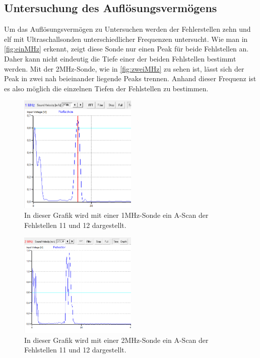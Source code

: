 \subsection{Untersuchung des Auflösungsvermögens}
\label{subsec:auflösung}
Um das Auflösungsvermögen zu Untersuchen werden der Fehlerstellen zehn und elf mit Ultraschallsonden unterschiedlicher Frequenzen untersucht.
Wie man in \autoref{fig:einMHz} erkennt, zeigt diese Sonde nur einen Peak für beide Fehlstellen an. Daher kann nicht eindeutig die Tiefe einer der beiden Fehlstellen bestimmt werden.
Mit der 2MHz-Sonde, wie in \autoref{fig:zweiMHz} zu sehen ist, lässt sich der Peak in zwei nah beieinander liegende Peaks trennen. Anhand dieser Frequenz ist es also möglich 
die einzelnen Tiefen der Fehlstellen zu bestimmen.
\begin{figure}
  \centering
\includegraphics[width=0.5\textwidth]{content/einMHz.pdf}
  \caption{In dieser Grafik wird mit einer 1MHz-Sonde ein A-Scan der Fehlstellen 11 und 12 dargestellt.}
  \label{fig:einMHz}
\end{figure}
\begin{figure}[H]
  \centering
\includegraphics[width=0.5\textwidth]{content/2MHz (unten).pdf}
  \caption{In dieser Grafik wird mit einer 2MHz-Sonde ein A-Scan der Fehlstellen 11 und 12 dargestellt.}
  \label{fig:zweiMHz}
\end{figure}

